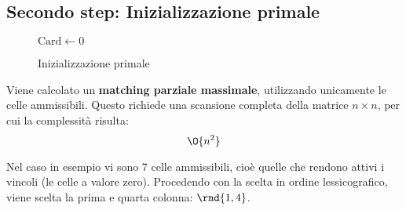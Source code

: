 \documentclass[\main/main.tex]{subfiles}
\begin{document}
\subsection{Secondo step: Inizializzazione primale}
\begin{figure}
	\begin{algorithm}[H]
		\SetAlgoLined
		\(\text{Card} \leftarrow 0\)
		\caption{Inizializzazione primale}
	\end{algorithm}
\end{figure}
\begin{complexity}
	Viene calcolato un \textbf{matching parziale massimale}, utilizzando unicamente le celle ammissibili. Questo richiede una scansione completa della matrice \(n\times n\), per cui la complessità risulta:
	\[
		\O{n^2}
	\]
\end{complexity}
Nel caso in esempio vi sono \(7\) celle ammissibili, cioè quelle che rendono attivi i vincoli (le celle a valore zero). Procedendo con la scelta in ordine lessicografico, viene scelta la prima e quarta colonna: \(\rnd{1, 4}\).
\end{document}
